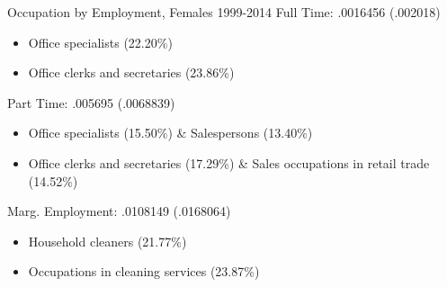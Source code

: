 \documentclass[hyperref={bookmarks=false}]{beamer}
\begin{document}
\begin{appendix}
\begin{frame}{Occupation by Employment, Females 1999-2014}
Full Time: .0016456 (.002018)
\begin{itemize}
\item Office specialists (22.20\%)
\item Office clerks and secretaries (23.86\%)
\end{itemize}
\vfill
Part Time: .005695 (.0068839)
\begin{itemize}
\item Office specialists (15.50\%) \& Salespersons (13.40\%)
\item Office clerks and secretaries (17.29\%) \&  Sales occupations in retail trade (14.52\%)
\end{itemize}
\vfill
Marg. Employment: .0108149 (.0168064)
\begin{itemize}
\item Household cleaners (21.77\%)
\item Occupations in cleaning services (23.87\%)
\end{itemize}
\end{frame}


\end{appendix}
\end{document}
